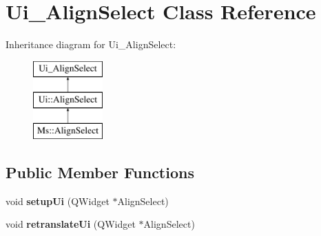 \hypertarget{class_ui___align_select}{}\section{Ui\+\_\+\+Align\+Select Class Reference}
\label{class_ui___align_select}
Inheritance diagram for Ui\+\_\+\+Align\+Select\+:\begin{figure}[H]
\begin{center}
\leavevmode
\includegraphics[height=3.000000cm]{class_ui___align_select}
\end{center}
\end{figure}
\subsection*{Public Member Functions}
\begin{DoxyCompactItemize}
\item 
\mbox{\label{class_ui___align_select_abe5b6b8a8f646c5b65f2ac89e1d41508}} 
void {\bfseries setup\+Ui} (Q\+Widget $\ast$Align\+Select)
\item 
\mbox{\label{class_ui___align_select_aca32256db69f21449b219cea1786d359}} 
void {\bfseries retranslate\+Ui} (Q\+Widget $\ast$Align\+Select)
\end{DoxyCompactItemize}
